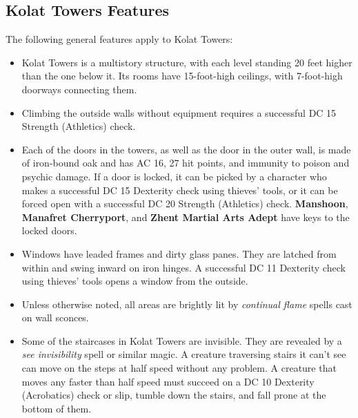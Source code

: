 \documentclass[10pt,a4paper,twoside,twocolumn,openany,nodeprecatedcode]{dndbook}
\begin{document}
\subsection{Kolat Towers Features}
The following general features apply to Kolat Towers:
\begin{itemize}

\item Kolat Towers is a multistory structure, with each level standing 20 feet higher than the one below it. Its rooms have 15-foot-high ceilings, with 7-foot-high doorways connecting them.
\item Climbing the outside walls without equipment requires a successful DC 15 Strength (Athletics) check.
\item Each of the doors in the towers, as well as the door in the outer wall, is made of iron-bound oak and has AC 16, 27 hit points, and immunity to poison and psychic damage. If a door is locked, it can be picked by a character who makes a successful DC 15 Dexterity check using thieves' tools, or it can be forced open with a successful DC 20 Strength (Athletics) check. \textbf{Manshoon}, \textbf{Manafret Cherryport}, and \textbf{Zhent Martial Arts Adept} have keys to the locked doors.
\item Windows have leaded frames and dirty glass panes. They are latched from within and swing inward on iron hinges. A successful DC 11 Dexterity check using thieves' tools opens a window from the outside.
\item Unless otherwise noted, all areas are brightly lit by \textit{continual flame} spells cast on wall sconces.
\item Some of the staircases in Kolat Towers are invisible. They are revealed by a \textit{see invisibility} spell or similar magic. A creature traversing stairs it can't see can move on the steps at half speed without any problem. A creature that moves any faster than half speed must succeed on a DC 10 Dexterity (Acrobatics) check or slip, tumble down the stairs, and fall prone at the bottom of them.
\end{itemize}
\end{document}
